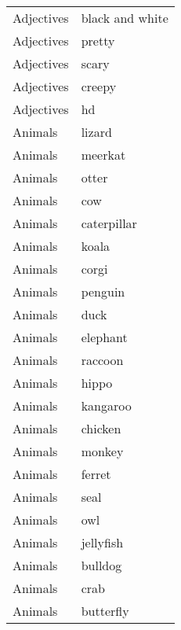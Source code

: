 \begin{supertabular}{l p{0.25\textwidth}}
       Adjectives &                    black and white \\
       Adjectives &                             pretty \\
       Adjectives &                              scary \\
       Adjectives &                             creepy \\
       Adjectives &                                 hd \\
          Animals &                             lizard \\
          Animals &                            meerkat \\
          Animals &                              otter \\
          Animals &                                cow \\
          Animals &                        caterpillar \\
          Animals &                              koala \\
          Animals &                              corgi \\
          Animals &                            penguin \\
          Animals &                               duck \\
          Animals &                           elephant \\
          Animals &                            raccoon \\
          Animals &                              hippo \\
          Animals &                           kangaroo \\
          Animals &                            chicken \\
          Animals &                             monkey \\
          Animals &                             ferret \\
          Animals &                               seal \\
          Animals &                                owl \\
          Animals &                          jellyfish \\
          Animals &                            bulldog \\
          Animals &                               crab \\
          Animals &                          butterfly \\

\end{supertabular}

